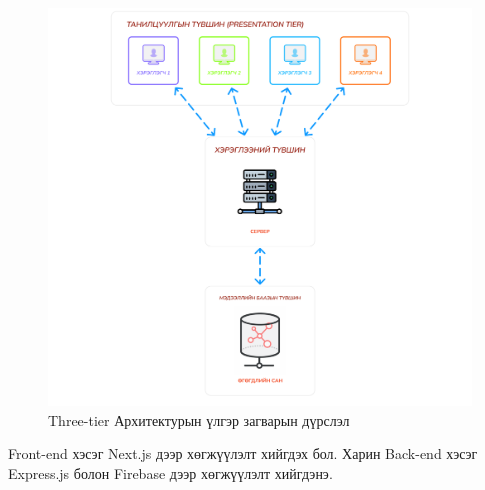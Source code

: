 \begin{figure}[h]
	\centering
	\includegraphics[width=15cm]{images/architecture.png}
	\caption{Three-tier Архитектурын үлгэр загварын дүрслэл}
	\label{fig:architecture}
\end{figure}

\clearpage

Front-end хэсэг Next.js дээр хөгжүүлэлт хийгдэх бол. Харин Back-end хэсэг Express.js болон Firebase дээр хөгжүүлэлт хийгдэнэ.

